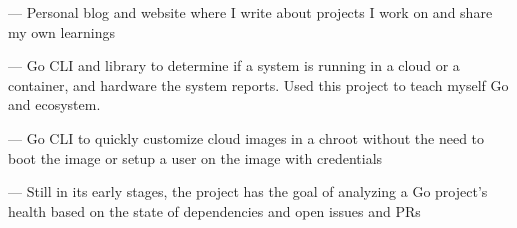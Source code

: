 

\begin{cventries}
\vspace{-4mm}

  \cventry
    {}
    {}
    {}
    {}
    {
      \begin{cvitems}
        \item {
           — Personal blog and
          website where I write about projects I work on and share my own
          learnings
        }
        \item {
           —
          Go CLI and library to determine if a system is running in a
          cloud or a container, and hardware the system reports. Used this
          project to teach myself Go and ecosystem.
        }
        \item {
           —
          Go CLI to quickly customize cloud images in a chroot without the
          need to boot the image or setup a user on the image with credentials
        }
        \item {
           —
          Still in its early stages, the project has the goal of analyzing a
          Go project's health based on the state of dependencies and open
          issues and PRs
        }
      \end{cvitems}
    }
    {}

\end{cventries}
